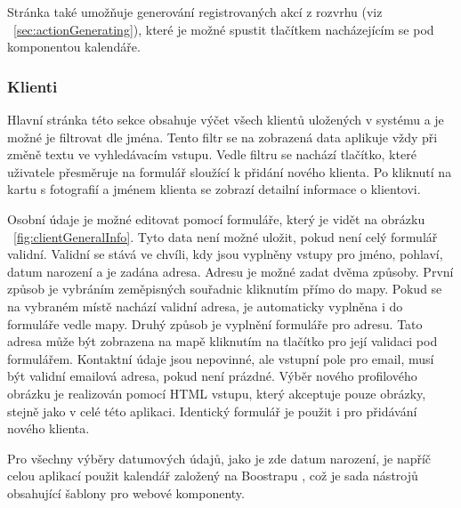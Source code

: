 \documentclass[
  glossaries,
]{kidiplom}
\begin{document}
Stránka také umožňuje generování registrovaných akcí z rozvrhu (viz ~\ref{sec:actionGenerating}), které je možné spustit tlačítkem nacházejícím se pod komponentou kalendáře.

\subsubsection{Klienti}
Hlavní stránka této sekce obsahuje výčet všech klientů uložených v systému a je možné je filtrovat dle jména. Tento filtr se na zobrazená data aplikuje vždy při změně textu ve vyhledávacím vstupu. Vedle filtru se nachází tlačítko, které uživatele přesměruje na formulář sloužící k přidání nového klienta. Po kliknutí na kartu s fotografií a jménem klienta se zobrazí detailní informace o klientovi. 

Osobní údaje je možné editovat pomocí formuláře, který je vidět na obrázku ~\ref{fig:clientGeneralInfo}. Tyto data není možné uložit, pokud není celý formulář validní. Validní se stává ve chvíli, kdy jsou vyplněny vstupy pro jméno, pohlaví, datum narození a je zadána adresa. Adresu je možné zadat dvěma způsoby. První způsob je vybráním zeměpisných souřadnic kliknutím přímo do mapy. Pokud se na vybraném místě nachází validní adresa, je automaticky vyplněna i do formuláře vedle mapy. Druhý způsob je vyplnění formuláře pro adresu. Tato adresa může být zobrazena na mapě kliknutím na tlačítko pro její validaci pod formulářem. Kontaktní údaje jsou nepovinné, ale vstupní pole pro email, musí být validní emailová adresa, pokud není prázdné. Výběr nového profilového obrázku je realizován pomocí HTML vstupu, který akceptuje pouze obrázky, stejně jako v celé této aplikaci. Identický formulář je použit i pro přidávání nového klienta.

Pro všechny výběry datumových údajů, jako je zde datum narození, je napříč celou aplikací použit kalendář založený na Boostrapu \cite{19}, což je sada nástrojů obsahující šablony pro webové komponenty.
\end{document}
